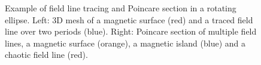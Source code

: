 \documentclass[my_thesis.tex]{subfiles}
\begin{document}
\begin{figure}
	\centering
	\hfill
	\caption{Example of field line tracing and Poincare section in a rotating ellipse. Left: 3D mesh of a magnetic surface (red) and a traced field line over two periods (blue). Right: Poincare section of multiple field lines, a magnetic surface (orange), a magnetic island (blue) and a chaotic field line (red).}
	\label{fig poincare section}
\end{figure}


\end{document}
